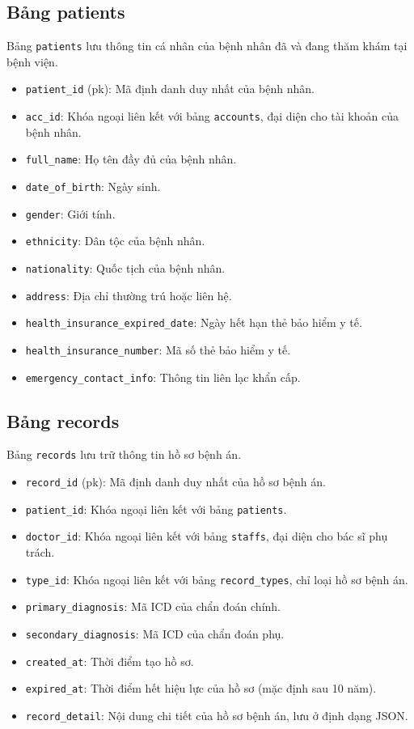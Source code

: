 \subsection{Bảng patients}
Bảng \texttt{patients} lưu thông tin cá nhân của bệnh nhân đã và đang thăm khám tại bệnh viện.
\begin{itemize}
  \item \texttt{patient\_id} (pk): Mã định danh duy nhất của bệnh nhân.
  \item \texttt{acc\_id}: Khóa ngoại liên kết với bảng \texttt{accounts}, đại diện cho tài khoản của bệnh nhân.
  \item \texttt{full\_name}: Họ tên đầy đủ của bệnh nhân.
  \item \texttt{date\_of\_birth}: Ngày sinh.
  \item \texttt{gender}: Giới tính.
  \item \texttt{ethnicity}: Dân tộc của bệnh nhân.
  \item \texttt{nationality}: Quốc tịch của bệnh nhân.
  \item \texttt{address}: Địa chỉ thường trú hoặc liên hệ.
  \item \texttt{health\_insurance\_expired\_date}: Ngày hết hạn thẻ bảo hiểm y tế.
  \item \texttt{health\_insurance\_number}: Mã số thẻ bảo hiểm y tế.
  \item \texttt{emergency\_contact\_info}: Thông tin liên lạc khẩn cấp.
\end{itemize}

\subsection{Bảng records}
Bảng \texttt{records} lưu trữ thông tin hồ sơ bệnh án.
\begin{itemize}
  \item \texttt{record\_id} (pk): Mã định danh duy nhất của hồ sơ bệnh án.
  \item \texttt{patient\_id}: Khóa ngoại liên kết với bảng \texttt{patients}.
  \item \texttt{doctor\_id}: Khóa ngoại liên kết với bảng \texttt{staffs}, đại diện cho bác sĩ phụ trách.
  \item \texttt{type\_id}: Khóa ngoại liên kết với bảng \texttt{record\_types}, chỉ loại hồ sơ bệnh án.
  \item \texttt{primary\_diagnosis}: Mã ICD của chẩn đoán chính.
  \item \texttt{secondary\_diagnosis}: Mã ICD của chẩn đoán phụ.
  \item \texttt{created\_at}: Thời điểm tạo hồ sơ.
  \item \texttt{expired\_at}: Thời điểm hết hiệu lực của hồ sơ (mặc định sau 10 năm).
  \item \texttt{record\_detail}: Nội dung chi tiết của hồ sơ bệnh án, lưu ở định dạng JSON.
\end{itemize}

